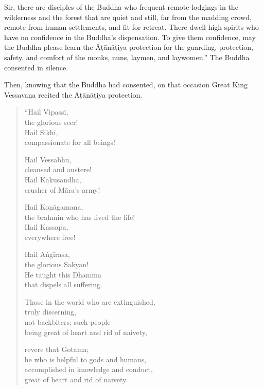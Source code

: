 \documentclass[12pt,openany]{book}%
\begin{document}
Sir, there are disciples of the Buddha who frequent remote lodgings in the wilderness and the forest that are quiet and still, far from the madding crowd, remote from human settlements, and fit for retreat. There dwell high spirits who have no confidence in the Buddha’s dispensation. To give them confidence, may the Buddha please learn the \textsanskrit{Āṭānāṭiya} protection for the guarding, protection, safety, and comfort of the monks, nuns, laymen, and laywomen.” The Buddha consented in silence. 

Then, knowing that the Buddha had consented, on that occasion Great King \textsanskrit{Vessavaṇa} recited the \textsanskrit{Āṭānāṭiya} protection. 

\begin{verse}%
“Hail \textsanskrit{Vipassī}, \\
the glorious seer! \\
Hail \textsanskrit{Sikhī}, \\
compassionate for all beings! 

Hail \textsanskrit{Vessabhū}, \\
cleansed and austere! \\
Hail Kakusandha, \\
crusher of \textsanskrit{Māra}’s army! 

Hail \textsanskrit{Koṇāgamana}, \\
the brahmin who has lived the life! \\
Hail Kassapa, \\
everywhere free! 

Hail \textsanskrit{Aṅgīrasa}, \\
the glorious Sakyan! \\
He taught this Dhamma \\
that dispels all suffering. 

Those in the world who are extinguished, \\
truly discerning, \\
not backbiters; such people \\
being great of heart and rid of naivety, 

revere that Gotama; \\
he who is helpful to gods and humans, \\
accomplished in knowledge and conduct, \\
great of heart and rid of naivety. 


\end{verse}
\end{document}
